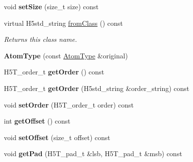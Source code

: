 \begin{DoxyCompactItemize}
\mbox{\label{class_h5_1_1_atom_type_a3821ea87f18925958ec200324995fcad}} 
void {\bfseries set\+Size} (size\+\_\+t size) const
\item 
\mbox{\label{class_h5_1_1_atom_type_a78b16fea33b398b689fd8c8512f59f49}} 
virtual H5std\+\_\+string \hyperlink{class_h5_1_1_atom_type_a78b16fea33b398b689fd8c8512f59f49}{from\+Class} () const
\begin{DoxyCompactList}\small\item\em Returns this class name. \end{DoxyCompactList}\item 
\mbox{\label{class_h5_1_1_atom_type_a38f79570d4fc0bc30f8421d6ebbb7642}} 
{\bfseries Atom\+Type} (const \hyperlink{class_h5_1_1_atom_type}{Atom\+Type} \&original)
\item 
\mbox{\label{class_h5_1_1_atom_type_a4cc64f4f58fdcbd9f2e9b5d72a2c7f5d}} 
H5\+T\+\_\+order\+\_\+t {\bfseries get\+Order} () const
\item 
\mbox{\label{class_h5_1_1_atom_type_a43fcbc0f9058acd436bd141e19500d4d}} 
H5\+T\+\_\+order\+\_\+t {\bfseries get\+Order} (H5std\+\_\+string \&order\+\_\+string) const
\item 
\mbox{\label{class_h5_1_1_atom_type_a2cd6cd68a223154dc08c037e03d59b6d}} 
void {\bfseries set\+Order} (H5\+T\+\_\+order\+\_\+t order) const
\item 
\mbox{\label{class_h5_1_1_atom_type_ab26e5f4e6898b740a84aa1c8cf09461e}} 
int {\bfseries get\+Offset} () const
\item 
\mbox{\label{class_h5_1_1_atom_type_ad3d58451829f62baf08f663f7153d267}} 
void {\bfseries set\+Offset} (size\+\_\+t offset) const
\item 
\mbox{\label{class_h5_1_1_atom_type_a537783731fe233e56db447e767db32d1}} 
void {\bfseries get\+Pad} (H5\+T\+\_\+pad\+\_\+t \&lsb, H5\+T\+\_\+pad\+\_\+t \&msb) const
\item 
\mbox{\label{class_h5_1_1_atom_type_a9968256a9b2a59bf2c7a6dde32a477c9}} 

\end{DoxyCompactItemize}
